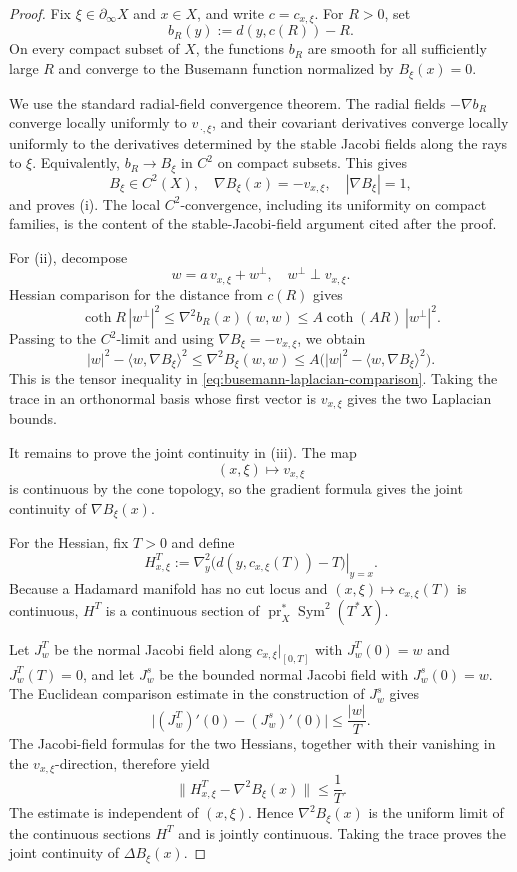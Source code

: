 \documentclass[12pt]{amsart}
\theoremstyle{definition}
\numberwithin{equation}{section}
\begin{document}
\begin{proof}
Fix \(\xi\in\partial_\infty X\) and \(x\in X\), and write
\(c=c_{x,\xi}\).  For \(R>0\), set
\[
  b_R(y):=d(y,c(R))-R.
\]
On every compact subset of \(X\), the functions \(b_R\) are smooth for
all sufficiently large \(R\) and converge to the Busemann function
normalized by \(B_\xi(x)=0\).

We use the standard radial-field convergence theorem.  The radial fields
\(-\nabla b_R\) converge locally uniformly to
\(v_{\,\cdot,\xi}\), and their covariant derivatives converge locally
uniformly to the derivatives determined by the stable Jacobi fields along
the rays to \(\xi\).  Equivalently, \(b_R\to B_\xi\) in
\(C^2\) on compact subsets.  This gives
\[
  B_\xi\in C^2(X),
  \quad
  \nabla B_\xi(x)=-v_{x,\xi},
  \quad
  |\nabla B_\xi|=1,
\]
and proves \textup{(i)}.  The local \(C^2\)-convergence, including its
uniformity on compact families, is the content of the stable-Jacobi-field
argument cited after the proof.

For \textup{(ii)}, decompose
\[
  w=a\,v_{x,\xi}+w^\perp,
  \quad
  w^\perp\perp v_{x,\xi}.
\]
Hessian comparison for the distance from \(c(R)\) gives
\[
  \coth R\,|w^\perp|^2
  \leq \nabla^2b_R(x)(w,w)
  \leq A\coth(AR)\,|w^\perp|^2.
\]
Passing to the \(C^2\)-limit and using
\(\nabla B_\xi=-v_{x,\xi}\), we obtain
\[
  |w|^2-\langle w,\nabla B_\xi\rangle^2
  \leq\nabla^2B_\xi(w,w)
  \leq
  A\bigl(|w|^2-\langle w,\nabla B_\xi\rangle^2\bigr).
\]
This is the tensor inequality in
\eqref{eq:busemann-laplacian-comparison}.  Taking the trace in an
orthonormal basis whose first vector is \(v_{x,\xi}\) gives the two
Laplacian bounds.

It remains to prove the joint continuity in \textup{(iii)}.  The map
\[
  (x,\xi)\longmapsto v_{x,\xi}
\]
is continuous by the cone topology, so the gradient formula gives the
joint continuity of \(\nabla B_\xi(x)\).

For the Hessian, fix \(T>0\) and define
\[
  H^T_{x,\xi}
  :=
  \left.
  \nabla_y^2\bigl(d(y,c_{x,\xi}(T))-T\bigr)
  \right|_{y=x}.
\]
Because a Hadamard manifold has no cut locus and
\((x,\xi)\mapsto c_{x,\xi}(T)\) is continuous, \(H^T\) is a continuous
section of
\(\operatorname{pr}_X^*\operatorname{Sym}^2(T^*X)\).

Let \(J_w^T\) be the normal Jacobi field along
\(c_{x,\xi}|_{[0,T]}\) with \(J_w^T(0)=w\) and \(J_w^T(T)=0\), and let
\(J_w^s\) be the bounded normal Jacobi field with \(J_w^s(0)=w\).
The Euclidean comparison estimate in the construction of \(J_w^s\)
gives
\[
  \bigl|(J_w^T)'(0)-(J_w^s)'(0)\bigr|
  \leq\frac{|w|}{T}.
\]
The Jacobi-field formulas for the two Hessians, together with their
vanishing in the \(v_{x,\xi}\)-direction, therefore yield
\[
  \bigl\|H^T_{x,\xi}-\nabla^2B_\xi(x)\bigr\|
  \leq\frac1T.
\]
The estimate is independent of \((x,\xi)\).  Hence
\(\nabla^2B_\xi(x)\) is the uniform limit of the continuous sections
\(H^T\) and is jointly continuous.  Taking the trace proves the joint
continuity of \(\Delta B_\xi(x)\).
\end{proof}
\end{document}
